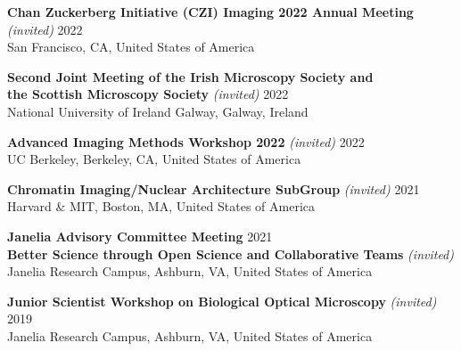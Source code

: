 \documentclass[margin,line]{res}
\begin{document}
\begin{resume}
\vspace*{-2.5mm}
{\bf  Chan Zuckerberg Initiative (CZI) Imaging 2022 Annual Meeting}  {\it (invited)} \hfill 2022\\
San Francisco, CA, United States of America %

\vspace*{-2.5mm}
{\bf  Second Joint Meeting of the Irish Microscopy Society and \\the Scottish Microscopy Society}  {\it (invited)} \hfill 2022\\
National University of Ireland Galway, Galway, Ireland %

\vspace*{-2.5mm}
{\bf  Advanced Imaging Methods Workshop 2022}  {\it (invited)} \hfill 2022\\
UC Berkeley, Berkeley, CA, United States of America %

\vspace*{-2.5mm}
{\bf  Chromatin Imaging/Nuclear Architecture SubGroup}  {\it (invited)} \hfill 2021\\
Harvard \& MIT, Boston, MA, United States of America %

\vspace*{-2.5mm}
{\bf  Janelia Advisory Committee Meeting}  \hfill 2021\\
{\bf Better Science through Open Science and Collaborative Teams}  {\it (invited)} \\
Janelia Research Campus, Ashburn, VA, United States of America %

\clearpage

\vspace*{-2.5mm}
{\bf  Junior Scientist Workshop on Biological Optical Microscopy} {\it (invited)}  \hfill 2019\\
Janelia Research Campus, Ashburn, VA, United States of America %


\end{resume}
\end{document}
